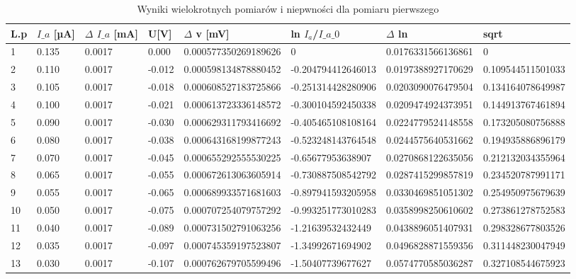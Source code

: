 \documentclass[a4paper]{article}
\begin{document}
\begin{table}[h!]
\centering
 \begin{tabular}{ | l | l | l | l | l | l | l | l | }
 \hline
 L.p & $I\_a$ [µA] & $\Delta$ $I\_a$ [mA] & U[V] & $\Delta$ v [mV] & ln $I_{a}$/$I\_a\_0$ & $\Delta$ ln & sqrt \\ \hline
1 & 0.135 & 0.0017 & 0.000 & 0.000577350269189626 & 0 & 0.0176331566136861 & 0 \\ \hline
2 & 0.110 & 0.0017 & -0.012 & 0.000598134878880452 & -0.204794412646013 & 0.0197388927170629 & 0.109544511501033 \\ \hline
3 & 0.105 & 0.0017 & -0.018 & 0.000608527183725866 & -0.251314428280906 & 0.0203090076479504 & 0.134164078649987 \\ \hline
4 & 0.100 & 0.0017 & -0.021 & 0.000613723336148572 & -0.300104592450338 & 0.0209474924373951 & 0.144913767461894 \\ \hline
5 & 0.090 & 0.0017 & -0.030 & 0.000629311793416692 & -0.405465108108164 & 0.0224779524148558 & 0.173205080756888 \\ \hline
6 & 0.080 & 0.0017 & -0.038 & 0.000643168199877243 & -0.523248143764548 & 0.0244575640531662 & 0.194935886896179 \\ \hline
7 & 0.070 & 0.0017 & -0.045 & 0.000655292555530225 & -0.65677953638907 & 0.0270868122635056 & 0.212132034355964 \\ \hline
8 & 0.065 & 0.0017 & -0.055 & 0.000672613063605914 & -0.730887508542792 & 0.0287415299857819 & 0.234520787991171 \\ \hline
9 & 0.055 & 0.0017 & -0.065 & 0.000689933571681603 & -0.897941593205958 & 0.0330469851051302 & 0.254950975679639 \\ \hline
10 & 0.050 & 0.0017 & -0.075 & 0.000707254079757292 & -0.993251773010283 & 0.0358998250610602 & 0.273861278752583 \\ \hline
11 & 0.040 & 0.0017 & -0.089 & 0.000731502791063256 & -1.21639532432449 & 0.0438896051407931 & 0.298328677803526 \\ \hline
12 & 0.035 & 0.0017 & -0.097 & 0.000745359197523807 & -1.34992671694902 & 0.0496828871559356 & 0.311448230047949 \\ \hline
13 & 0.030 & 0.0017 & -0.107 & 0.000762679705599496 & -1.50407739677627 & 0.0574770585036287 & 0.327108544675923 \\ \hline
 \end{tabular}
\caption{Wyniki wielokrotnych pomiarów i niepwności dla pomiaru pierwszego}
\label{T1_pomiar}
\end{table}
\end{document}
